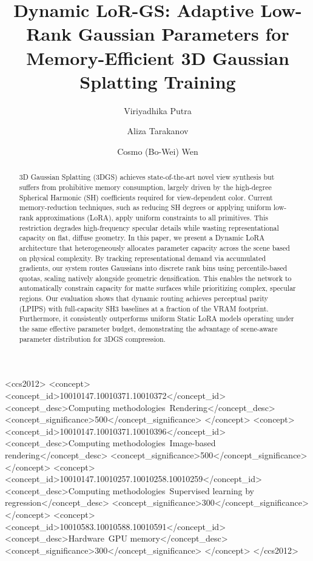 \documentclass[sigconf]{acmart}
\begin{document}
\title{Dynamic LoR-GS: Adaptive Low-Rank Gaussian Parameters for Memory-Efficient 3D Gaussian Splatting Training}

\author{{Viriyadhika Putra}}

\author{{Aliza Tarakanov}}

\author{{Cosmo (Bo-Wei) Wen}}

\begin{abstract}
3D Gaussian Splatting (3DGS) achieves state-of-the-art novel view synthesis but 
suffers from prohibitive memory consumption, largely driven by the high-degree 
Spherical Harmonic (SH) coefficients required for view-dependent color. Current 
memory-reduction techniques, such as reducing SH degrees or applying uniform 
low-rank approximations (LoRA), apply uniform constraints to all primitives. 
This restriction degrades high-frequency specular details while wasting 
representational capacity on flat, diffuse geometry. In this paper, we present 
a Dynamic LoRA architecture that heterogeneously allocates parameter capacity 
across the scene based on physical complexity. By tracking representational 
demand via accumulated gradients, our system routes Gaussians into discrete 
rank bins using percentile-based quotas, scaling natively alongside geometric 
densification. This enables the network to automatically constrain capacity for 
matte surfaces while prioritizing complex, specular regions. Our evaluation 
shows that dynamic routing achieves perceptual parity (LPIPS) with 
full-capacity SH3 baselines at a fraction of the VRAM footprint. Furthermore, 
it consistently outperforms uniform Static LoRA models operating under the same 
effective parameter budget, demonstrating the advantage of scene-aware 
parameter distribution for 3DGS compression.
\end{abstract}

\begin{CCSXML}
<ccs2012>
  <concept>
    <concept_id>10010147.10010371.10010372</concept_id>
    <concept_desc>Computing methodologies~Rendering</concept_desc>
    <concept_significance>500</concept_significance>
  </concept>
  <concept>
    <concept_id>10010147.10010371.10010396</concept_id>
    <concept_desc>Computing methodologies~Image-based rendering</concept_desc>
    <concept_significance>500</concept_significance>
  </concept>
  <concept>
    <concept_id>10010147.10010257.10010258.10010259</concept_id>
    <concept_desc>Computing methodologies~Supervised learning by regression</concept_desc>
    <concept_significance>300</concept_significance>
  </concept>
  <concept>
    <concept_id>10010583.10010588.10010591</concept_id>
    <concept_desc>Hardware~GPU memory</concept_desc>
    <concept_significance>300</concept_significance>
  </concept>
</ccs2012>
\end{CCSXML}
\end{document}
